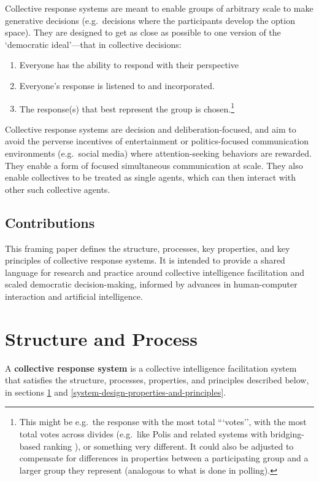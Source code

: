 \documentclass[sigconf,authorversion,nonacm,linkcolor=blue,colorlinks]{acmart}
\def\tightlist{} %
\begin{document}
Collective response systems are meant to enable groups of arbitrary scale to make generative decisions (e.g.~decisions where the participants develop the option space).    They are designed to get as close as possible to one version of the `democratic ideal'---that in collective decisions:

\begin{enumerate}
\def\labelenumi{\arabic{enumi}.}
\tightlist
\item
  Everyone has the ability to respond with their perspective
\item
  Everyone's response is listened to and incorporated.
\item
  The response(s) that best represent the group is chosen.\footnote{This might be e.g.~the response with the most total ```votes'', with the most total votes across divides (e.g.~like Polis \cite{smallPolis2021} and related systems with bridging-based ranking \cite{ovadya2022bridging}), or something very different. It could also be adjusted to compensate for differences in properties between a participating group and a larger group they represent (analogous to what is done in polling). }
\end{enumerate}

Collective response systems are decision and deliberation-focused, and aim to avoid the perverse incentives of entertainment or politics-focused communication environments (e.g.~social media) where attention-seeking behaviors are rewarded. %
They enable a form of focused simultaneous communication at scale. They also enable collectives to be treated as single agents, which can then interact with other such collective agents. %

\subsection*{Contributions}
This framing paper defines the structure, processes, key properties, and key principles of collective response systems. It is intended to provide a shared language for research and practice around collective intelligence facilitation and scaled democratic decision-making, informed by advances in human-computer interaction and artificial intelligence. 



\hypertarget{structure-and-process}{%
\section{Structure and Process}\label{structure-and-process}}
A \textbf{collective response system} is a collective intelligence facilitation system that satisfies the structure, processes, properties, and principles described below, in sections \ref{structure-and-process} and \ref{system-design-properties-and-principles}.
\end{document}
